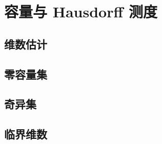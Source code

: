 \section{容量与 Hausdorff 测度}
\label{b1:sec:2603}


\subsection{维数估计}
\label{b1:subsec:260301}

\subsection{零容量集}
\label{b1:subsec:260302}

\subsection{奇异集}
\label{b1:subsec:260303}

\subsection{临界维数}
\label{b1:subsec:260304}


